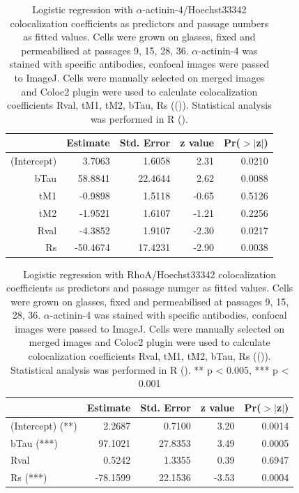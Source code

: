 \documentclass[alpha-refs]{wiley-article}
\begin{document}
\begin{table}[hbt!]
  \caption{Logistic regression with $\alpha$-actinin-4/Hoechst33342 colocalization coefficients as predictors and passage numbers as fitted values. Cells were grown on glasses, fixed and permeabilised at passages 9, 15, 28, 36. $\alpha$-actinin-4 was stained with specific antibodies, confocal images were passed to ImageJ. Cells were manually selected on merged images and Coloc2 plugin were used to calculate colocalization coefficients Rval, tM1, tM2, bTau, Rs ((\cite{rueden2017imagej2})). Statistical analysis was performed in R (\cite{team2014r}).}
\centering
\begin{tabular}{rrrrr}
  \hline
 & Estimate & Std. Error & z value & Pr($>$$|$z$|$) \\
  \hline
(Intercept) & 3.7063 & 1.6058 & 2.31 & 0.0210 \\
  bTau & 58.8841 & 22.4644 & 2.62 & 0.0088 \\
  tM1 & -0.9898 & 1.5118 & -0.65 & 0.5126 \\
  tM2 & -1.9521 & 1.6107 & -1.21 & 0.2256 \\
  Rval & -4.3852 & 1.9107 & -2.30 & 0.0217 \\
  Rs & -50.4674 & 17.4231 & -2.90 & 0.0038 \\
   \hline
\end{tabular}
\end{table}

\begin{table}[hbt!]
  \caption{Logistic regression with RhoA/Hoechst33342 colocalization coefficients as predictors and passage numger as fitted values. Cells were grown on glasses, fixed and permeabilised at passages 9, 15, 28, 36. $\alpha$-actinin-4 was stained with specific antibodies, confocal images were passed to ImageJ. Cells were manually selected on merged images and Coloc2 plugin were used to calculate colocalization coefficients Rval, tM1, tM2, bTau, Rs ((\cite{rueden2017imagej2})). Statistical analysis was performed in R (\cite{team2014r}). ** p < 0.005, *** p < 0.001}
\centering
\begin{tabular}{l|rrrr}
  \hline
 & Estimate & Std. Error & z value & Pr($>$$|$z$|$) \\
  \hline
(Intercept) (**) & 2.2687 & 0.7100 & 3.20 & 0.0014 \\
  bTau (***) & 97.1021 & 27.8353 & 3.49 & 0.0005 \\
  Rval & 0.5242 & 1.3355 & 0.39 & 0.6947 \\
  Rs (***) & -78.1599 & 22.1536 & -3.53 & 0.0004 \\
   \hline
\end{tabular}
\end{table}
\end{document}
